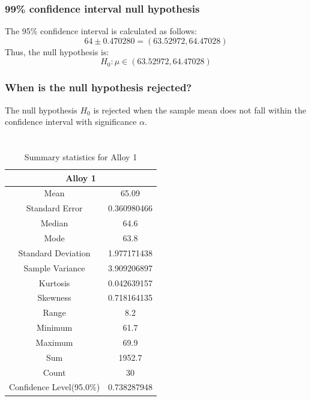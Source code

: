 \documentclass[letterpaper]{article}
\begin{document}
\subsubsection*{99\% confidence interval null hypothesis}
The 95\% confidence interval is calculated as follows:
$$64 \pm 0.470280 = (63.52972, 64.47028)$$
Thus, the null hypothesis is:
$$H_0: \mu \in (63.52972, 64.47028)$$

\subsubsection*{When is the null hypothesis rejected?}
The null hypothesis $H_0$ is rejected when the sample mean
does not fall within the confidence interval with significance $\alpha$.


\section{}%
\subsection{}%

\begin{table}[H]
 \centering
 \begin{tabular}{|c|c|}
  \hline
  \multicolumn{2}{|c|}{Alloy 1}          \\ \hline
  Mean                     & 65.09       \\ \hline
  Standard Error           & 0.360980466 \\ \hline
  Median                   & 64.6        \\ \hline
  Mode                     & 63.8        \\ \hline
  Standard Deviation       & 1.977171438 \\ \hline
  Sample Variance          & 3.909206897 \\ \hline
  Kurtosis                 & 0.042639157 \\ \hline
  Skewness                 & 0.718164135 \\ \hline
  Range                    & 8.2         \\ \hline
  Minimum                  & 61.7        \\ \hline
  Maximum                  & 69.9        \\ \hline
  Sum                      & 1952.7      \\ \hline
  Count                    & 30          \\ \hline
  Confidence Level(95.0\%) & 0.738287948 \\ \hline
 \end{tabular}
 \caption{Summary statistics for Alloy 1}
 \label{3a1}
\end{table}
\end{document}
